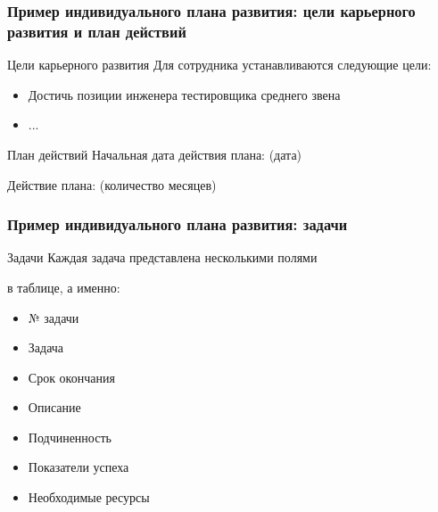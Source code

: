 \documentclass{../industrial-development}
\begin{document}
\begin{frame} \frametitle{Пример индивидуального плана развития: цели карьерного развития и план действий }
 \begin{block}{ Цели карьерного развития}
Для сотрудника устанавливаются следующие цели:
\begin{itemize}
  \item Достичь позиции инженера тестировщика среднего звена
  \item ...
  \end{itemize}
\end{block}
 \begin{block}{ План действий}
Начальная дата действия плана: (дата)

Действие плана: (количество месяцев)
\end{block}
\end{frame}

\begin{frame} \frametitle{Пример индивидуального плана развития: задачи }

 \begin{block}{ Задачи}
Каждая задача представлена несколькими полями 

в таблице, а именно:
\begin{itemize}
  \item № задачи
  \item Задача
  \item Срок окончания
  \item Описание
  \item Подчиненность
  \item Показатели успеха
  \item Необходимые ресурсы
  \end{itemize}
\end{block}


\end{frame}
\end{document}

